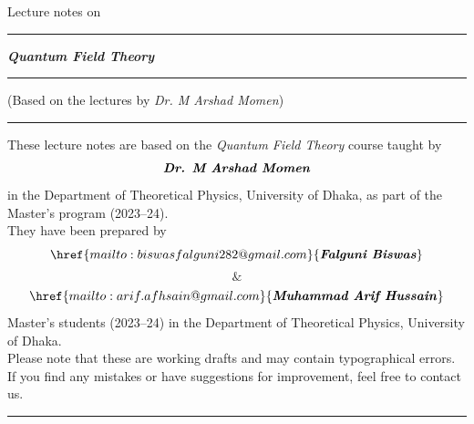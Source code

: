 \documentclass[14pt]{article} %
\begin{document}
\begin{titlepage}
    \centering
    \vspace*{3cm}
    {Lecture notes on \par}
    \vspace{1cm}
    \hrule
    \vspace{1cm}
    {\huge \textit{\textbf{Quantum Field Theory}} \par}
    \vspace{1cm}
    \hrule
    \vspace{1cm}
    \small
   (Based on the lectures by \textit{Dr. M Arshad Momen})
\vspace{3cm}
\end{titlepage}

\newpage
\thispagestyle{empty} %

\vspace*{6cm} %
\hrule
\vspace*{1.5cm}
\begin{center}
    \begin{minipage}{0.85\textwidth}
        \centering
        
        These lecture notes are based on the \textit{Quantum Field Theory} course taught by $${\textbf{\textit{Dr. M Arshad Momen}}}$$ in the Department of Theoretical Physics, University of Dhaka, as part of the Master's program (2023–24). \\
        \vspace{0.6cm}
        They have been prepared by $$\href{mailto:biswasfalguni282@gmail.com}{\textbf{\textit{Falguni Biswas}}}$$ $$\textbf{\&}$$ $$\href{mailto:arif.afhsain@gmail.com}{\textbf{\textit{Muhammad Arif Hussain}}}$$ Master's students (2023–24) in the Department of Theoretical Physics, University of Dhaka.\\
        \vspace{0.6cm}
        Please note that these are working drafts and may contain typographical errors. If you find any mistakes or have suggestions for improvement, feel free to contact us.
    \end{minipage}
\end{center}
\vspace*{1.5cm}
\hrule
\vspace*{\fill} %
\newpage
\tableofcontents
\newpage
\end{document}
